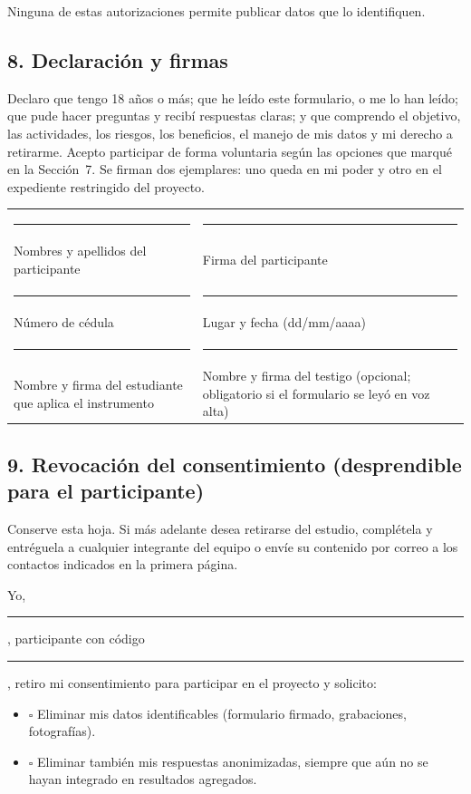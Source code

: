 Ninguna de estas autorizaciones permite publicar datos que lo identifiquen.

\subsection*{8. Declaración y firmas}

Declaro que tengo 18 años o más; que he leído este formulario, o me lo han leído; que pude hacer preguntas y recibí respuestas claras; y que comprendo el objetivo, las actividades, los riesgos, los beneficios, el manejo de mis datos y mi derecho a retirarme. Acepto participar de forma voluntaria según las opciones que marqué en la Sección~7. Se firman dos ejemplares: uno queda en mi poder y otro en el expediente restringido del proyecto.

\begin{center}
\small
\begin{tabularx}{\textwidth}{@{}X X@{}}
\rule{0pt}{2.2em}\rule{0.95\linewidth}{0.4pt} & \rule{0.95\linewidth}{0.4pt} \\
Nombres y apellidos del participante & Firma del participante \\
\rule{0pt}{2.2em}\rule{0.95\linewidth}{0.4pt} & \rule{0.95\linewidth}{0.4pt} \\
Número de cédula & Lugar y fecha (dd/mm/aaaa) \\
\rule{0pt}{2.2em}\rule{0.95\linewidth}{0.4pt} & \rule{0.95\linewidth}{0.4pt} \\
Nombre y firma del estudiante que aplica el instrumento & Nombre y firma del testigo (opcional; obligatorio si el formulario se leyó en voz alta) \\
\end{tabularx}
\end{center}

\subsection*{9. Revocación del consentimiento (desprendible para el participante)}

Conserve esta hoja. Si más adelante desea retirarse del estudio, complétela y entréguela a cualquier integrante del equipo o envíe su contenido por correo a los contactos indicados en la primera página.

Yo, \rule{6.5cm}{0.4pt}, participante con código \rule{2.6cm}{0.4pt}, retiro mi consentimiento para participar en el proyecto y solicito:
\begin{itemize}[label={}, leftmargin=*]
\item $\square$ Eliminar mis datos identificables (formulario firmado, grabaciones, fotografías).
\item $\square$ Eliminar también mis respuestas anonimizadas, siempre que aún no se hayan integrado en resultados agregados.
\end{itemize}
